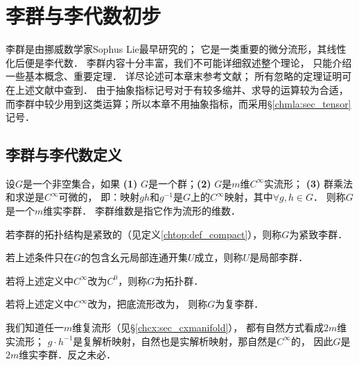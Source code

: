 
\chapter{李群与李代数初步}\label{chlg}

李群是由挪威数学家Sophus Lie最早研究的；
它是一类重要的微分流形，其线性化后便是李代数．
李群内容十分丰富，我们不可能详细叙述整个理论，
只能介绍一些基本概念、重要定理．
详尽论述可本章末参考文献；
所有忽略的定理证明可在上述文献中查到．
由于抽象指标记号对于有较多缩并、求导的运算较为合适，
而李群中较少用到这类运算；所以本章不用抽象指标，而采用\S \ref{chmla:sec_tensor}记号．


\section{李群与李代数定义}\label{chlg:sec_definition}

\begin{definition}\label{chlg:def_lg}
    设$G$是一个非空集合，如果
    {\bfseries (1)} $G$是一个群；{\bfseries (2)} $G$是$m$维$C^\infty$实流形；
    {\bfseries (3)} 群乘法和求逆是$C^\infty$可微的，
    即：映射$gh$和$g^{-1}$是$G$上的$C^\infty$映射，其中$\forall g,h\in G$．
    则称$G$是一个$m$维实{\heiti 李群}．
    李群{\heiti 维数}是指它作为流形的维数．

    若李群的拓扑结构是紧致的（见定义\ref{chtop:def_compact}），则称$G$为{\heiti 紧致李群}．
    
    若上述条件只在$G$的包含幺元局部连通开集$U$成立，则称$U$是{\heiti 局部李群}．
       
    若将上述定义中$C^\infty$改为$C^0$，则称$G$为{\heiti 拓扑群}．
    
    若将上述定义中$C^\infty$改为，把底流形改为，
    则称$G$为{\heiti 复李群}．
\end{definition}

我们知道任一$m$维复流形（见\S\ref{chcx:sec_cxmanifold}），
都有自然方式看成$2m$维实流形；
$g\cdot h^{-1}$是复解析映射，自然也是实解析映射，那自然是$C^\infty$的，
因此$G$是$2m$维实李群．反之未必．


